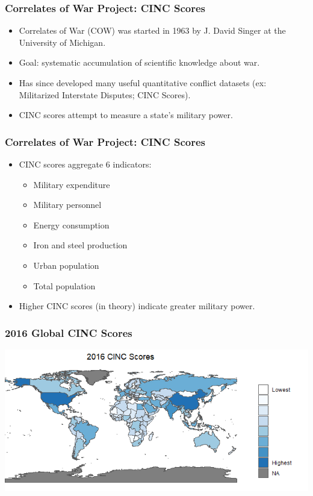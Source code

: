 \documentclass[handout]{beamer}
\begin{document}
\begin{frame} 
	\frametitle{\LARGE{Correlates of War Project: CINC Scores}}
	\begin{itemize}
		\item Correlates of War (COW) was started in 1963 by J. David Singer at the University of Michigan. \pause
		\item Goal: systematic accumulation of scientific knowledge about war. \pause
		\item Has since developed many useful quantitative conflict datasets (ex: Militarized Interstate Disputes; CINC Scores).
		\item CINC scores attempt to measure a state's military power.		
	\end{itemize}
\end{frame}

\begin{frame} 
	\frametitle{\LARGE{Correlates of War Project: CINC Scores}}
	\begin{itemize}
		\item CINC scores aggregate 6 indicators: \pause
		\begin{itemize}
			\item Military expenditure
			\item Military personnel
			\item Energy consumption
			\item Iron and steel production
			\item Urban population
			\item Total population \pause
		\end{itemize}	
		\item Higher CINC scores (in theory) indicate greater military power.	
	\end{itemize}
\end{frame}

\begin{frame} 
	\frametitle{\LARGE{2016 Global CINC Scores}}	
	\centering
	\includegraphics[width=\textwidth,height=0.9\textheight,keepaspectratio]{CINC2016.png}
\end{frame}
\end{document}
